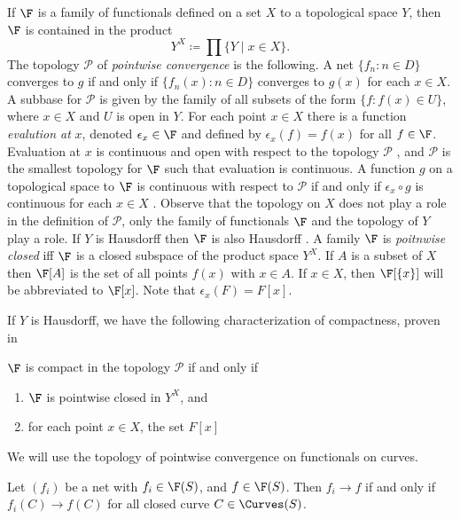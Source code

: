 If $\F$ is a family of functionals defined on a set $X$ to a topological space $Y$, then $\F$ is contained in the product 
\[
Y^X \coloneqq \prod \{ Y \mid x \in X \}.
\]
The topology $\mathcal{P}$ of \emph{pointwise convergence} is the following.
A net $\{ f_n \colon n \in D\}$ converges to $g$ if and only if $\{ f_n(x) \colon n \in D\}$ converges to $g(x)$ for each $x \in X$. A subbase for $\mathcal{P}$ is given by the family of all subsets of the form $\{ f \colon f(x) \in U \}$, where $x \in X$ and $U$ is open in $Y$. For each point $x\in X$ there is a function \emph{evalution at } $x$, denoted $\epsilon_x \in \F$ and defined by $\epsilon_x(f)=f(x)$ for all $f \in \F$.
Evaluation at $x$ is continuous and open with respect to the topology $\mathcal{P}$ \cite[Theorem~3.2]{K75:GenTop}, and $\mathcal{P}$ is the smallest topology for $\F$ such that evaluation is continuous. A function $g$ on a topological space to $\F$ is continuous with respect to $\mathcal{P}$ if and only if $\epsilon_x \circ g$ is continuous for each $x \in X$ \cite[Theorem~3.3]{K75:GenTop}. Observe that the topology on $X$ does not play a role in the definition of $\mathcal{P}$, only the family of functionals $\F$ and the topology of $Y$ play a role. If $Y$ is Hausdorff then $\F$ is also Hausdorff \cite[3.5]{K75:GenTop}.
A family $\F$ is \emph{poitnwise closed} iff $\F$ is a closed subspace of the product space $Y^X$.
If $A$ is a subset of $X$ then $\F[A]$ is the set of all points $f(x)$ with $x \in A$.
If $x \in X$, then $\F[\{x\}]$ will be abbreviated to $\F[x]$. Note that $\epsilon_x(F)=F[x]$.

If $Y$ is Hausdorff, we have the following characterization of compactness, proven in \cite[Chapter~7,Theorem~1]{K75:GenTop}

\begin{theorem}
 $\F$ is compact in the topology $\mathcal{P}$ if and only if
 \begin{enumerate}
     \item $\F$ is pointwise closed in $Y^X$, and
     \item for each point $x \in X$, the set $F[x]$
 \end{enumerate}
 \label{thm:pointwisecompact}
\end{theorem}

We will use the topology of pointwise convergence on functionals on curves.

\begin{definition}
Let $(f_i)$ be a net with $f_i \in \F(S)$, and $f \in \F(S)$.  Then
 $f_i \to f$ if and only if $f_i(C) \to f(C)$ for all closed curve $C \in \Curves(S)$.
\end{definition}




